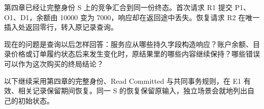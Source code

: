 第四章已经让完整身份 S 上的竞争汇合到同一份终态。首次请求 R1 提交 P1、O1、D1，余额由 10000 变为 7000，响应却在返回途中丢失。恢复请求 R2 在唯一插入处返回零行，转入原记录查询。

现在的问题是查询以后怎样回答：服务应从哪些持久字段构造响应？账户余额、目录价格或订单履约状态后来发生变化时，原结果里的哪些内容继续保持？哪些错误可以作为这次购买的终局结论？

以下继续采用第四章的完整身份、Read Committed 与共同事务规则，在 E1 有效、相关记录保留期间恢复。同一 S 的恢复保留原输入，独立场景会就地列出自己的初始状态。
